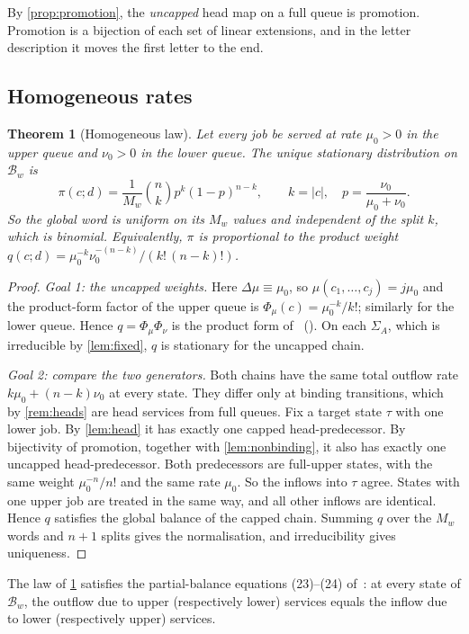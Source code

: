 \documentclass[11pt,a4paper]{article}
\newtheorem{theorem}{Theorem}[section]
\theoremstyle{plain}
\theoremstyle{plain}
\newcommand{\Bal}{\mathcal{B}}
\newcommand{\Sg}{\Sigma}
\begin{document}
By \cref{prop:promotion}, the \emph{uncapped} head map on a full queue is promotion. Promotion is a bijection of each set of linear extensions, and in the letter description it moves the first letter to the end.

\subsection{Homogeneous rates}

\begin{theorem}[Homogeneous law]\label{thm:homog}
Let every job be served at rate $\mu_0>0$ in the upper queue and $\nu_0>0$ in the lower queue. The unique stationary distribution on $\Bal_w$ is
\[
 \pi(c;d)=\frac1{M_w}\binom{n}{k}p^k(1-p)^{n-k},\qquad k=|c|,\quad p=\frac{\nu_0}{\mu_0+\nu_0}.
\]
So the global word is uniform on its $M_w$ values and independent of the split $k$, which is binomial. Equivalently, $\pi$ is proportional to the product weight $q(c;d)=\mu_0^{-k}\nu_0^{-(n-k)}/(k!\,(n-k)!)$.
\end{theorem}

\begin{proof}
\emph{Goal 1: the uncapped weights.} Here $\Delta\mu\equiv\mu_0$, so $\mu(c_1,\dots,c_j)=j\mu_0$ and the product-form factor of the upper queue is $\Phi_\mu(c)=\mu_0^{-k}/k!$; similarly for the lower queue. Hence $q=\Phi_\mu\Phi_\nu$ is the product form of~\cite[Theorem~5]{CD2021} (\cite[Theorem~3]{DG2024}). On each $\Sg_A$, which is irreducible by \cref{lem:fixed}, $q$ is stationary for the uncapped chain.

\emph{Goal 2: compare the two generators.} Both chains have the same total outflow rate $k\mu_0+(n-k)\nu_0$ at every state. They differ only at binding transitions, which by \cref{rem:heads} are head services from full queues. Fix a target state $\tau$ with one lower job. By \cref{lem:head} it has exactly one capped head-predecessor. By bijectivity of promotion, together with \cref{lem:nonbinding}, it also has exactly one uncapped head-predecessor. Both predecessors are full-upper states, with the same weight $\mu_0^{-n}/n!$ and the same rate $\mu_0$. So the inflows into $\tau$ agree. States with one upper job are treated in the same way, and all other inflows are identical. Hence $q$ satisfies the global balance of the capped chain. Summing $q$ over the $M_w$ words and $n+1$ splits gives the normalisation, and irreducibility gives uniqueness.
\end{proof}

\begin{proposition}\label{prop:partial}
The law of \cref{thm:homog} satisfies the partial-balance equations (23)--(24) of~\cite{DG2024}: at every state of $\Bal_w$, the outflow due to upper (respectively lower) services equals the inflow due to lower (respectively upper) services.
\end{proposition}
\end{document}
